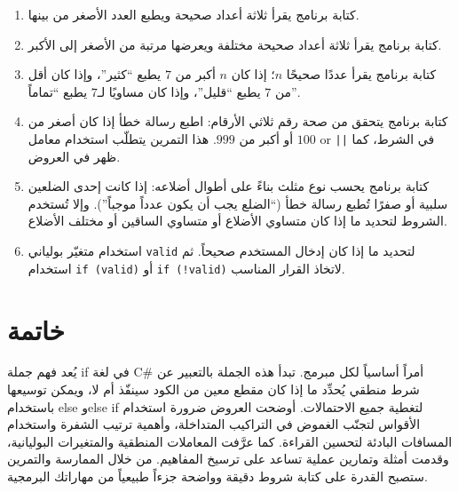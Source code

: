 ﻿\documentclass[12pt]{article}
\begin{document}
\begin{enumerate}
  \item كتابة برنامج يقرأ ثلاثة أعداد صحيحة ويطبع العدد الأصغر من بينها.
  \item كتابة برنامج يقرأ ثلاثة أعداد صحيحة مختلفة ويعرضها مرتبة من الأصغر إلى الأكبر.
  \item كتابة برنامج يقرأ عددًا صحيحًا \(n\)؛ إذا كان \(n\) أكبر من \(7\) يطبع ``كثير''، وإذا كان أقل من \(7\) يطبع ``قليل''، وإذا كان مساويًا لـ\(7\) يطبع ``تماماً''.
  \item كتابة برنامج يتحقق من صحة رقم ثلاثي الأرقام: اطبع رسالة خطأ إذا كان أصغر من \(100\) أو أكبر من \(999\). هذا التمرين يتطلّب استخدام معامل \textenglish{or} \texttt{||} في الشرط، كما ظهر في العروض.
  \item كتابة برنامج يحسب نوع مثلث بناءً على أطوال أضلاعه: إذا كانت إحدى الضلعين سلبية أو صفرًا تُطبع رسالة خطأ (``الضلع يجب أن يكون عدداً موجباً''). وإلا تُستخدم الشروط لتحديد ما إذا كان متساوي الأضلاع أو متساوي الساقين أو مختلف الأضلاع.
  \item استخدام متغيّر بولياني \verb|valid| لتحديد ما إذا كان إدخال المستخدم صحيحاً. ثم استخدام \verb|if (valid)| أو \verb|if (!valid)| لاتخاذ القرار المناسب.
\end{enumerate}

\section*{خاتمة}

يُعد فهم جملة \textenglish{if} في لغة C\# أمراً أساسياً لكل مبرمج. تبدأ هذه الجملة بالتعبير عن شرط منطقي يُحدِّد ما إذا كان مقطع معين من الكود سينفّذ أم لا، ويمكن توسيعها باستخدام \textenglish{else} و\textenglish{else if} لتغطية جميع الاحتمالات. أوضحت العروض ضرورة استخدام الأقواس لتجنّب الغموض في التراكيب المتداخلة، وأهمية ترتيب الشفرة واستخدام المسافات البادئة لتحسين القراءة. كما عرَّفت المعاملات المنطقية والمتغيرات البوليانية، وقدمت أمثلة وتمارين عملية تساعد على ترسيخ المفاهيم. من خلال الممارسة والتمرين ستصبح القدرة على كتابة شروط دقيقة وواضحة جزءاً طبيعياً من مهاراتك البرمجية.
\end{document}
